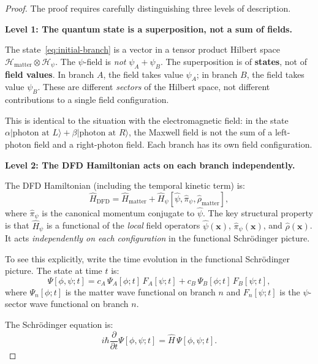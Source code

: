 \documentclass[12pt,a4paper]{article}
\begin{document}
\begin{proof}
The proof requires carefully distinguishing three levels of description.

\textbf{Level 1: The quantum state is a superposition, not a sum of
fields.}

The state~\eqref{eq:initial-branch} is a vector in a tensor product
Hilbert space $\mathcal{H}_\mathrm{matter} \otimes \mathcal{H}_\psi$.
The $\psi$-field is \emph{not} $\psi_A + \psi_B$. The superposition is
of \textbf{states}, not of \textbf{field values}. In branch $A$, the
field takes value $\psi_A$; in branch $B$, the field takes value $\psi_B$.
These are different \emph{sectors} of the Hilbert space, not different
contributions to a single field configuration.

This is identical to the situation with the electromagnetic field: in
the state $\alpha|\text{photon at }L\rangle + \beta|\text{photon at }R\rangle$,
the Maxwell field is not the sum of a left-photon field and a
right-photon field. Each branch has its own field configuration.

\textbf{Level 2: The DFD Hamiltonian acts on each branch independently.}

The DFD Hamiltonian (including the temporal kinetic term) is:
\begin{equation}
\hat{H}_\mathrm{DFD} = \hat{H}_\mathrm{matter}
+ \hat{H}_\psi[\hat\psi, \hat\pi_\psi, \hat\rho_\mathrm{matter}],
\end{equation}
where $\hat\pi_\psi$ is the canonical momentum conjugate to $\hat\psi$.
The key structural property is that $\hat{H}_\psi$ is a functional of
the \emph{local} field operators $\hat\psi(\mathbf{x})$,
$\hat\pi_\psi(\mathbf{x})$, and $\hat\rho(\mathbf{x})$. It acts
\emph{independently on each configuration} in the functional
Schr\"odinger picture.

To see this explicitly, write the time evolution in the functional
Schr\"odinger picture. The state at time $t$ is:
\begin{equation}
\Psi[\phi, \psi; t]
= c_A\,\Psi_A[\phi; t]\,F_A[\psi; t]
+ c_B\,\Psi_B[\phi; t]\,F_B[\psi; t],
\end{equation}
where $\Psi_n[\phi; t]$ is the matter wave functional on branch $n$
and $F_n[\psi; t]$ is the $\psi$-sector wave functional on branch $n$.

The Schr\"odinger equation is:
\begin{equation}
i\hbar\frac{\partial}{\partial t}\Psi[\phi,\psi;t]
= \hat{H}\,\Psi[\phi,\psi;t].
\end{equation}


\end{proof}
\end{document}
